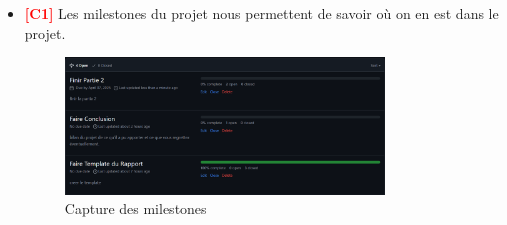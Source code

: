 \begin{itemize}
    \item \textbf{\textcolor{red}{[C1]}} Les milestones du projet nous permettent de savoir où on en est dans le projet.
    \begin{figure}[H]
    \centering
    \includegraphics[width=0.8\textwidth]{Images/C1.png}
    \caption{Capture des milestones}
    \label{fig:imageC1}
    \end{figure}

\end{itemize}